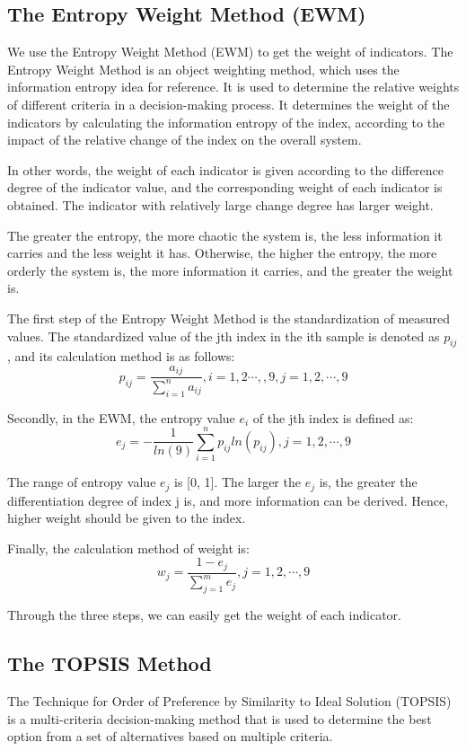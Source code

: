 \MinParskip{}

\subsection{The Entropy Weight Method (EWM) }
We use the Entropy Weight Method (EWM) to get the weight of indicators. The Entropy Weight Method is an object weighting method, which uses the information entropy idea for reference. It is used to determine the relative weights of different criteria in a decision-making process. It determines the weight of the indicators by calculating the information entropy of the index, according to the impact of the relative change of the index on the overall system.

In other words, the weight of each indicator is given according to the difference degree of the indicator value, and the corresponding weight of each indicator is obtained. The indicator with relatively large change degree has larger weight. 

The greater the entropy, the more chaotic the system is, the less information it carries and the less weight it has. Otherwise, the higher the entropy, the more orderly the system is, the more information it carries, and the greater the weight is.

The first step of the Entropy Weight Method is the standardization of measured values. The standardized value of the jth index in the ith sample is denoted as $p_{ij}$, and its calculation method is as follows:$$p_{ij}=\frac{a_{ij}}{\sum_{i=1}^na_{ij}},i=1,2\cdots,,9,j=1,2,\cdots,9$$

Secondly, in the EWM, the entropy value $e_i$ of the jth index is defined as:$$e_j=-\frac{1}{ln(9)}\sum_{i=1}^np_{ij}ln(p_{ij}),j=1,2,\cdots,9$$

The range of entropy value $e_j$ is [0, 1]. The larger the $e_j$ is, the greater the differentiation degree of index j is, and more information can be derived. Hence, higher weight should be given to the index. 

Finally, the calculation method of weight is:$$w_j=\frac{1-e_j}{\sum_{j=1}^me_j},j=1,2,\cdots,9$$

Through the three steps, we can easily get the weight of each indicator.


\subsection{The TOPSIS Method}

The Technique for Order of Preference by Similarity to Ideal Solution (TOPSIS) is a multi-criteria decision-making method that is used to determine the best option from a set of alternatives based on multiple criteria. 

